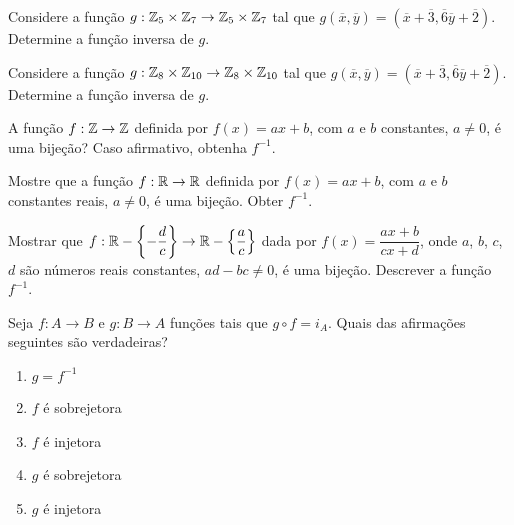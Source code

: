 \documentclass[12pt]{exam}
\begin{document}
\vspace{.3cm}

\questao{} Considere a fun{\c c}{\~a}o $g : \mathbb{Z}_5 \times \mathbb{Z}_7 \to \mathbb{Z}_5 \times \mathbb{Z}_7$ tal que $g(\overline{x},\overline{y}) = (\overline{x} + \overline{3}, \overline{6}\overline{y} + \overline{2})$. Determine a fun\c{c}\~ao inversa de $g$.

\vspace{.3cm}

\questao{} Considere a fun{\c c}{\~a}o $g : \mathbb{Z}_8 \times \mathbb{Z}_{10} \to \mathbb{Z}_8 \times \mathbb{Z}_{10}$ tal que $g(\overline{x},\overline{y}) = (\overline{x} + \overline{3}, \overline{6}\overline{y} + \overline{2})$. Determine a fun\c{c}\~ao inversa de $g$.

\vspace{.3cm}

\questao{} A fun{\c c}{\~a}o $f : \mathbb{Z} \to \mathbb{Z}$ definida por $f(x) = ax + b$, com $a$ e $b$ constantes, $a \ne 0$, {\'e} uma bije{\c c}{\~a}o? Caso afirmativo, obtenha $f^{-1}$.

\vspace{.3cm}


\questao{} Mostre que a fun{\c c}{\~a}o $f : \mathbb{R} \to \mathbb{R}$ definida por $f(x) = ax + b$, com $a$ e $b$ constantes reais, $a \ne 0$, {\'e} uma bije{\c c}{\~a}o. Obter $f^{-1}$.

\vspace{.3cm}

\questao{} Mostrar que $f : \mathbb{R} - \left\{-\dfrac{d}{c}\right\} \to \mathbb{R}  - \left\{\dfrac{a}{c}\right\}$ dada por $f(x) =  \dfrac{ax + b}{cx + d}$, onde $a$, $b$, $c$, $d$ s{\~a}o n{\'u}meros reais constantes, $ad - bc \ne 0$, {\'e} uma bije{\c c}{\~a}o. Descrever a fun{\c c}{\~a}o $f^{-1}$.

\vspace{.3cm}

\questao{} Seja $f : A \to B$ e $g : B \to A$ fun\c{c}\~oes tais que $g \circ f = i_A$. Quais das afirma\c{c}\~oes seguintes s\~ao verdadeiras?
\begin{enumerate}[label={\alph*})]
    \item $g = f^{-1}$
    \item $f$ \'e sobrejetora
    \item $f$ \'e injetora
    \item $g$ \'e sobrejetora
    \item $g$ \'e injetora
\end{enumerate}

\vspace{.3cm}
\end{document}
